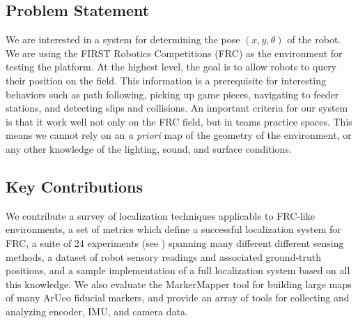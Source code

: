 \documentclass{article}
\newcommand{\Newnameref}[1]{\textit{\nameref{#1}}}
\begin{document}
\subsection{Problem Statement}

  We are interested in a system for determining the pose $(x, y, \theta)$ of the robot. We are using the FIRST Robotics Competitions (FRC) as the environment for testing the platform. At the highest level, the goal is to allow robots to query their position on the field. This information is a prerequisite for interesting behaviors such as path following, picking up game pieces, navigating to feeder stations, and detecting slips and collisions. An important criteria for our system is that it work well not only on the FRC field, but in teams practice spaces. This means we cannot rely on an \textit{a priori} map of the geometry of the environment, or any other knowledge of the lighting, sound, and surface conditions.





\subsection{Key Contributions}

  We contribute a survey of localization techniques applicable to FRC-like environments, a set of metrics which define a successful localization system for FRC, a suite of 24 experiments (see \Newnameref{section:experiments}) spanning many different different sensing methods, a dataset of robot sensory readings and associated ground-truth positions, and a sample implementation of a full localization system based on all this knowledge. We also evaluate the MarkerMapper tool for building large maps of many ArUco fiducial markers, and provide an array of tools for collecting and analyzing encoder, IMU, and camera data.
\end{document}

